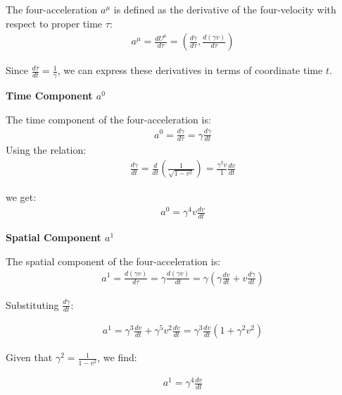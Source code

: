 \documentclass[12pt]{book}
\begin{document}
            The four-acceleration \( a^\mu \) is defined as the derivative of the four-velocity with respect to proper time \( \tau \):
            \begin{align}
            a^\mu = \frac{dU^\mu}{d\tau} = \left(\frac{d\gamma}{d\tau}, \frac{d(\gamma v)}{d\tau}\right)
            \end{align}
            
            Since \( \frac{d\tau}{dt} = \frac{1}{\gamma} \), we can express these derivatives in terms of coordinate time \( t \).
            
            \textbf{Time Component \( a^0 \)}
            
            The time component of the four-acceleration is:
            \begin{align}
            a^0 = \frac{d\gamma}{d\tau} = \gamma \frac{d\gamma}{dt}
            \end{align}
            Using the relation:
            \begin{align}
            \frac{d\gamma}{dt} = \frac{d}{dt} \left(\frac{1}{\sqrt{1 - v^2}}\right) = \frac{\gamma^3 v}{1} \frac{dv}{dt}
            \end{align}
            
            we get:
            \begin{align}
            a^0 = \gamma^4 v \frac{dv}{dt}
            \end{align}
            
            \textbf{Spatial Component \( a^1 \)}
            
            The spatial component of the four-acceleration is:
            \begin{align}
            a^1 = \frac{d(\gamma v)}{d\tau} = \gamma \frac{d(\gamma v)}{dt} = \gamma \left( \gamma \frac{dv}{dt} + v \frac{d\gamma}{dt} \right)
            \end{align}
            
            Substituting \( \frac{d\gamma}{dt} \):
            
            \begin{align}
            a^1 = \gamma^3 \frac{dv}{dt} + \gamma^5 v^2 \frac{dv}{dt} = \gamma^3 \frac{dv}{dt} \left(1 + \gamma^2 v^2\right)
            \end{align}
            
            Given that \( \gamma^2 = \frac{1}{1 - v^2} \), we find:
            
            \begin{align}
            a^1 = \gamma^4 \frac{dv}{dt}
            \end{align}
            
\end{document}
